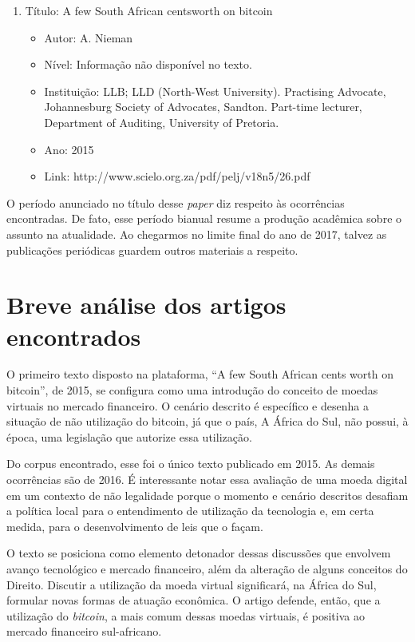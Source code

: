 \documentclass[12pt]{article}
\begin{document}
\begin{enumerate}
\item Título: A few South African centsworth on bitcoin
\begin{itemize}

\item Autor: 
A. Nieman
\item Nível: Informação não disponível no texto.
\item Instituição: LLB; LLD (North-West University). Practising Advocate, Johannesburg Society of Advocates, Sandton. Part-time lecturer, Department of Auditing, University of Pretoria.
\item Ano: 
2015
\item Link: 
http://www.scielo.org.za/pdf/pelj/v18n5/26.pdf
\end{itemize}

\end{enumerate}

O período anunciado no título desse \textit{paper} diz respeito às ocorrências encontradas. De fato, esse período bianual resume a produção acadêmica sobre o assunto na atualidade. Ao chegarmos no limite final do ano de 2017, talvez as publicações periódicas guardem outros materiais a respeito.

\section{Breve análise dos artigos encontrados}

O primeiro texto disposto na plataforma, “A few South African cents worth on bitcoin”, de 2015, se configura como uma introdução do conceito de moedas virtuais no mercado financeiro. O cenário descrito é específico e desenha a situação de não utilização do bitcoin, já que o país, A África do Sul, não possui, à época, uma legislação que autorize essa utilização.

Do corpus encontrado, esse foi o único texto publicado em 2015. As demais ocorrências são de 2016. É interessante notar essa avaliação de uma moeda digital em um contexto de não legalidade porque o momento e cenário descritos desafiam a política local para o entendimento de utilização da tecnologia e, em certa medida, para o desenvolvimento de leis que o façam.

O texto se posiciona como elemento detonador dessas discussões que envolvem avanço tecnológico e mercado financeiro, além da alteração de alguns conceitos do Direito. Discutir a utilização da moeda virtual significará, na África do Sul, formular novas formas de atuação econômica. O artigo defende, então, que a utilização do \textit{bitcoin}, a mais comum dessas moedas virtuais, é positiva ao mercado financeiro sul-africano.
\end{document}
